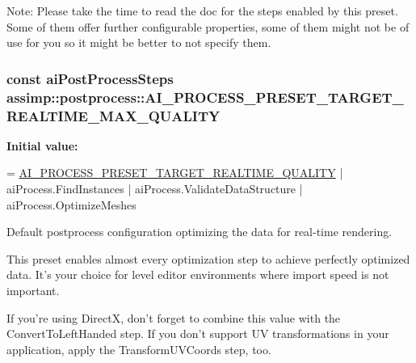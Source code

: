 Note\+: Please take the time to read the doc for the steps enabled by this preset. Some of them offer further configurable properties, some of them might not be of use for you so it might be better to not specify them. \hypertarget{namespaceassimp_1_1postprocess_a6496316f894a3e7fd973dba09dffb2ad}{
\subsubsection[{A\+I\+\_\+\+P\+R\+O\+C\+E\+S\+S\+\_\+\+P\+R\+E\+S\+E\+T\+\_\+\+T\+A\+R\+G\+E\+T\+\_\+\+R\+E\+A\+L\+T\+I\+M\+E\+\_\+\+M\+A\+X\+\_\+\+Q\+U\+A\+L\+I\+T\+Y}]{\setlength{\rightskip}{0pt plus 5cm}const {\bf ai\+Post\+Process\+Steps} assimp\+::postprocess\+::\+A\+I\+\_\+\+P\+R\+O\+C\+E\+S\+S\+\_\+\+P\+R\+E\+S\+E\+T\+\_\+\+T\+A\+R\+G\+E\+T\+\_\+\+R\+E\+A\+L\+T\+I\+M\+E\+\_\+\+M\+A\+X\+\_\+\+Q\+U\+A\+L\+I\+T\+Y}}\label{namespaceassimp_1_1postprocess_a6496316f894a3e7fd973dba09dffb2ad}
{\bfseries Initial value\+:}
\begin{DoxyCode}
=
      \hyperlink{namespaceassimp_1_1postprocess_acc49259290e35890a2f5c58ffdc0b8fd}{AI\_PROCESS\_PRESET\_TARGET\_REALTIME\_QUALITY} |
      aiProcess.FindInstances |
      aiProcess.ValidateDataStructure |
      aiProcess.OptimizeMeshes
\end{DoxyCode}
Default postprocess configuration optimizing the data for real-\/time rendering.

This preset enables almost every optimization step to achieve perfectly optimized data. It's your choice for level editor environments where import speed is not important.

If you're using Direct\+X, don't forget to combine this value with the {\ttfamily Convert\+To\+Left\+Handed} step. If you don't support U\+V transformations in your application, apply the {\ttfamily Transform\+U\+V\+Coords} step, too.

